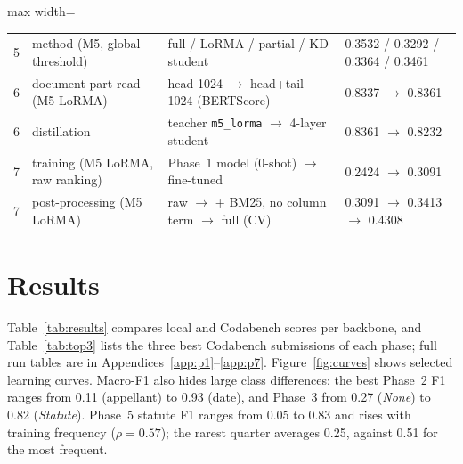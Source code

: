 \documentclass[11pt, oneside]{article}
\newcommand{\run}[1]{\texttt{#1}}
\begin{document}
\begin{table}[htbp]
\begin{adjustbox}{max width=\textwidth}
\begin{tabular}{clll}
5 & method (M5, global threshold) & full / LoRMA / partial / KD student & 0.3532 / 0.3292 / 0.3364 / 0.3461\\
6 & document part read (M5 LoRMA) & head 1024 $\to$ head+tail 1024 (BERTScore) & 0.8337 $\to$ 0.8361\\
6 & distillation & teacher \run{m5\_lorma} $\to$ 4-layer student & 0.8361 $\to$ 0.8232\\
7 & training (M5 LoRMA, raw ranking) & Phase~1 model (0-shot) $\to$ fine-tuned & 0.2424 $\to$ 0.3091\\
7 & post-processing (M5 LoRMA) & raw $\to$ + BM25, no column term $\to$ full (CV) & 0.3091 $\to$ 0.3413 $\to$ 0.4308\\
\bottomrule
\end{tabular}
\end{adjustbox}
\end{table}

\section{Results}
Table~\ref{tab:results} compares local and Codabench scores per backbone, and Table~\ref{tab:top3} lists the three
best Codabench submissions of each phase; full run tables are in Appendices~\ref{app:p1}--\ref{app:p7}.
Figure~\ref{fig:curves} shows selected learning curves. Macro-F1 also hides large class differences: the best Phase~2
F1 ranges from 0.11 (appellant) to 0.93 (date), and Phase~3 from 0.27 (\emph{None}) to 0.82 (\emph{Statute}).
Phase~5 statute F1 ranges from 0.05 to 0.83 and rises with training frequency ($\rho=0.57$); the rarest quarter
averages 0.25, against 0.51 for the most frequent.
\end{document}
